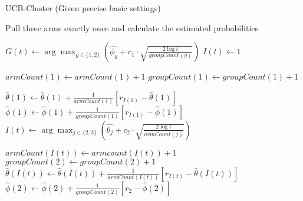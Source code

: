 \documentclass{article}
\begin{document}
\begin{minipage}{15cm}
\begin{algorithm}[H]
    \caption{UCB-Cluster (Given precise basic settings)}
    \begin{algorithmic}[1]
            \State Pull three arms exactly once and calculate the estimated probabilities
        \EndFor
            
            \State $G(t) \leftarrow\arg\max_{g\in \{1,2\}}(\hat{\phi_g} + c_1 \cdot \sqrt{\frac{2\log t}{groupCount(g)}})$ 
            \State {}
                \State $I(t) \leftarrow 1$  
                
                \State $armCount(1) \leftarrow armCount(1) + 1$  
                \State $groupCount(1) \leftarrow groupCount(1) + 1$

                
                \State $\hat{\theta}(1) \leftarrow \hat{\theta}(1)  + \frac{1}{armCount(1)}\left[
                    r_{I(1)} - \hat{\theta}(1)
                \right]$ 
                \State $\hat{\phi}(1) \leftarrow \hat{\phi}(1)  + \frac{1}{groupCount(1)}\left[
                    r_{I(1)} - \hat{\phi}(1)
                \right]$ 
                \State $I(t) \leftarrow \arg\max_{
                    j\in \{2,3\}
                    } ( \hat{\theta_j} + c_2 \cdot 
                    \sqrt{\frac{2\log t}{armCount(j)}})$
                
                \State $armCount(I(t)) \leftarrow armcount(I(t)) + 1$  
                    \State $groupCount(2) \leftarrow groupCount(2) + 1$
                \State $\hat{\theta}(I(t)) \leftarrow \hat{\theta}(I(t))  + \frac{1}{armCount(I(t))}\left[
                    r_{I(t)} - \hat{\theta}(I(t))
                \right]$ 
                \State $\hat{\phi}(2) \leftarrow \hat{\phi}(2)  + \frac{1}{groupCount(2)}\left[
                    r_{2} - \hat{\phi}(2)
                \right]$  
            \EndIf
        \EndFor
    \end{algorithmic}
\end{algorithm}
\end{minipage}
\end{document}
